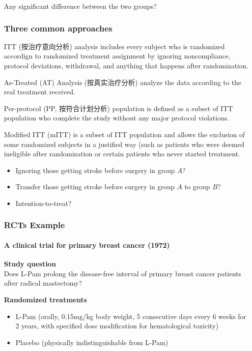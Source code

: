 \documentclass[table,10pt]{beamer}
\begin{document}
\begin{CJK*}{UTF8}{gbsn}
\begin{frame}[t]
\alert{Any significant difference between the two groups?}
\end{frame}


\begin{frame}[t]
\frametitle{Three common approaches}
\alert{ITT (按治疗意向分析)} analysis includes every subject who is randomized accordign to randomized 
treatment assignment by ignoring noncompliance, protocol deviations, withdrawal, 
and anything that happens after randomization.

\alert{As-Treated (AT) Analysis (按真实治疗分析)} analyze the data according to the real treatment received.

\alert{Per-protocol (PP, 按符合计划分析)} population is defined as a subset of ITT population who 
complete the study without any major protocol violations.

\alert{Modified ITT (mITT)} is a subset of ITT population and allows the exclusion 
of some randomized subjects in a justified way (such as patients who were deemed 
ineligible after randomization or certain patients who never started treatment.


\begin{itemize}
	\item<3-> Ignoring those getting stroke before surgery in group $A$?
	\item<4-> Transfer those getting stroke before surgery in group $A$ to group $B$?
	\item<5-> Intention-to-treat?
\end{itemize}
\end{frame}


\begin{frame}[t]
\frametitle{RCTs Example}
\framesubtitle{A clinical trial for primary breast cancer (1972)}
\textbf{Study question}\\
Does L-Pam prolong the disease-free interval of primary breast cancer patients after radical mastectomy?

\textbf{Randomized treatments}\\
\begin{itemize}
	\item L-Pam (orally, 0.15mg/kg body weight, 5 consecutive days every 6 weeks for 2 years, with 
		specified dose modification for hematological toxicity)
	\item Placebo (physically indistinguishable from L-Pam)
\end{itemize}


\end{frame}
\end{CJK*}
\end{document}
